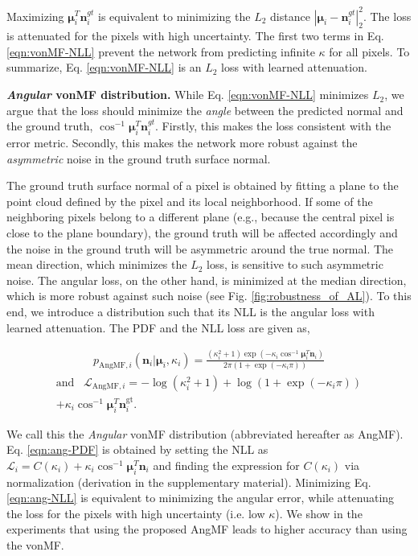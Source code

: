 \documentclass[10pt,twocolumn,letterpaper]{article}
\begin{document}
Maximizing $\boldsymbol{\mu}^T_{i} \mathbf{n}^{gt}_{i}$ is equivalent to minimizing the $L_2$ distance $|\boldsymbol{\mu}_{i} - \mathbf{n}^{gt}_{i}|^2_2$. The loss is attenuated for the pixels with high uncertainty. The first two terms in Eq. \ref{eqn:vonMF-NLL} prevent the network from predicting infinite $\kappa$ for all pixels. To summarize, Eq. \ref{eqn:vonMF-NLL} is an $L_2$ loss with learned attenuation.



\noindent
\textbf{\textit{Angular} vonMF distribution.} While Eq. \ref{eqn:vonMF-NLL} minimizes $L_2$, we argue that the loss should minimize the \textit{angle} between the predicted normal and the ground truth, $\cos^{-1}{\boldsymbol{\mu}^T_{i} \mathbf{n}^{gt}_{i}}$. Firstly, this makes the loss consistent with the error metric. Secondly, this makes the network more robust against the \textit{asymmetric} noise in the ground truth surface normal. 

The ground truth surface normal of a pixel is obtained by fitting a plane to the point cloud defined by the pixel and its local neighborhood. If some of the neighboring pixels belong to a different plane (e.g., because the central pixel is close to the plane boundary), the ground truth will be affected accordingly and the noise in the ground truth will be asymmetric around the true normal. The mean direction, which minimizes the $L_2$ loss, is sensitive to such asymmetric noise. The angular loss, on the other hand, is minimized at the median direction, which is more robust against such noise (see Fig. \ref{fig:robustness_of_AL}). To this end, we introduce a distribution such that its NLL is the angular loss with learned attenuation. The PDF and the NLL loss are given as,

\begin{align}
\label{eqn:ang-PDF}
p_{\text{AngMF},i}(\mathbf{n}_i|\boldsymbol{\mu}_i,\kappa_i) = 
\frac{(\kappa_i^2+1)\exp(-\kappa_i \cos^{-1} \boldsymbol{\mu}_i^T \mathbf{n}_i)}{2\pi (1 + \exp(-\kappa_i \pi))}
\end{align}
\begin{multline}
\label{eqn:ang-NLL}
\text{and} \;\;\; \mathcal{L}_{\text{AngMF},i} = -\log (\kappa^2_{i} +1) 
+\log (1 + \exp(-\kappa_i \pi)) \\
+\kappa_i \cos^{-1} \boldsymbol{\mu}_i^T \mathbf{n}_i^\text{gt}.
\end{multline}

We call this the \textit{Angular} vonMF distribution (abbreviated hereafter as AngMF). Eq. \ref{eqn:ang-PDF} is obtained by setting the NLL as $\mathcal{L}_i = C(\kappa_i) + \kappa_i \cos^{-1} \boldsymbol{\mu}_i^T \mathbf{n}_i$ and finding the expression for $C(\kappa_i)$ via normalization (derivation in the supplementary material). Minimizing Eq. \ref{eqn:ang-NLL} is equivalent to minimizing the angular error, while attenuating the loss for the pixels with high uncertainty (i.e. low $\kappa$). We show in the experiments that using the proposed AngMF leads to higher accuracy than using the vonMF.
\end{document}
